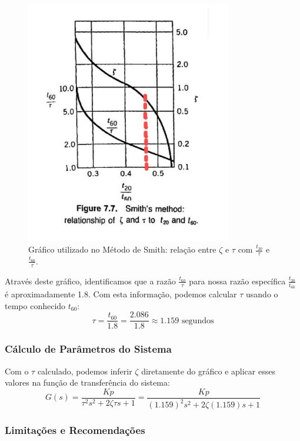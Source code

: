 \begin{figure}[h]
    \centering
    \includegraphics[width=0.8\textwidth]{atividades/10-atividade/assets/analise-smith.png}
    \caption{Gráfico utilizado no Método de Smith: relação entre \(\zeta\) e \(\tau\) com \(\frac{t_{20}}{\tau}\) e \(\frac{t_{60}}{\tau}\).}
    \label{fig:analise-smith}
\end{figure}

Através deste gráfico, identificamos que a razão \(\frac{t_{60}}{\tau}\) para nossa razão específica \(\frac{t_{20}}{t_{60}}\) é aproximadamente 1.8. Com esta informação, podemos calcular \(\tau\) usando o tempo conhecido \(t_{60}\):
\[
    \tau = \frac{t_{60}}{1.8} = \frac{2.086}{1.8} \approx 1.159 \text{ segundos}
\]

\subsubsection{Cálculo de Parâmetros do Sistema}

Com o \(\tau\) calculado, podemos inferir \(\zeta\) diretamente do gráfico e aplicar esses valores na função de transferência do sistema:
\[
    G(s) = \frac{Kp}{\tau^2 s^2 + 2 \zeta \tau s + 1} = \frac{Kp}{(1.159)^2 s^2 + 2 \zeta (1.159) s + 1}
\]

\subsubsection{Limitações e Recomendações}

